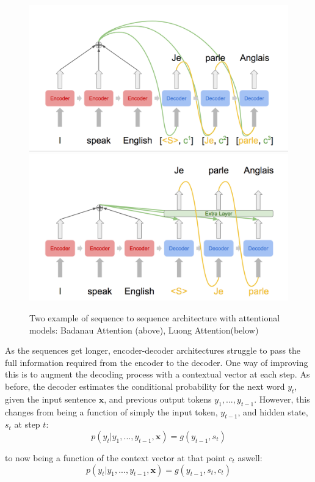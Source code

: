 \begin{figure}[tb]{}
    \centering

    \includegraphics[width=.7\linewidth]{ModelPics/bahd_diag.png}
    \includegraphics[width=.7\linewidth]{ModelPics/luong_diag2.png}
    \caption{Two example of sequence to sequence architecture with attentional models: Badanau Attention (above), Luong Attention(below)}
    \label{fig:attention} 

\end{figure}


As the sequences get longer, encoder-decoder architectures struggle to pass the full information required from the encoder to the decoder. 
One way of improving this is to augment the decoding process with a contextual vector at each step.  
As before, the decoder estimates the conditional probability for the next word $y_t$, given the input sentence $\mathbf{x}$, and previous output tokens ${y_1, ..., y_{t-1}}$.
 However, this changes from being a function of simply the input token, $y_{t-1}$, and hidden state, $s_{t}$ at step $t$:
\begin{equation}
p(y_t| y_1, ..., y_{t-1}, \mathbf{x} ) = g(y_{t-1}, s_t)
\end{equation}

to now being a function of the context vector at that point $c_t$ aswell:
\begin{equation}
p(y_t| y_1, ..., y_{t-1}, \mathbf{x} ) = g(y_{t-1}, s_t, c_t)
\end{equation}

